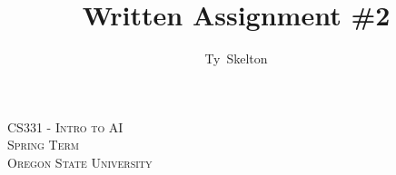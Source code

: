 \documentclass[10pt,draftclsnofoot,onecolumn]{IEEEtran}
\begin{document}
\singlespacing %
\title{Written Assignment \#2}

\author{Ty~Skelton}

\maketitle

\begin{center}
\scshape                      %
CS331 - Intro to AI \\        %
Spring Term\\[\baselineskip]  %
Oregon State University\par   %
\end{center}

\IEEEpeerreviewmaketitle

\newpage
\end{document}
